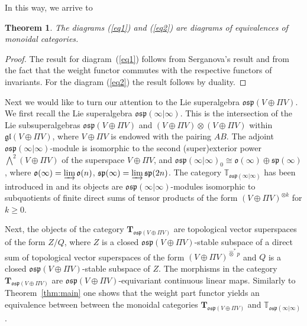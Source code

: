 \documentclass[12pt,reqno]{amsart}
\newtheorem{thm}{Theorem}[section]
\theoremstyle{definition}
\theoremstyle{remark}
\begin{document}
In this way, we arrive to
\begin{thm}\label{thm:main2}
    The diagrams (\ref{eq1}) and (\ref{eq2}) are diagrams of equivalences of monoidal categories.
\end{thm}
\begin{proof}
    The result for diagram~(\ref{eq1}) follows from Serganova's result and from the fact that the weight functor commutes with the respective functors of invariants. For the diagram (\ref{eq2}) the result follows by duality.
\end{proof}

Next we would like to turn our attention to the Lie superalgebra $\mathfrak{osp}(V \oplus \Pi V)$. We first recall the Lie superalgebra $\mathfrak{osp}(\infty | \infty)$. This is the intersection of the Lie subsuperalgebras 
$\mathfrak{osp}(V \oplus \Pi V)$ and $(V \oplus \Pi V)\otimes (V \oplus \Pi V)$ within $\mathfrak{gl}(V \oplus \Pi V)$,
where $V\oplus \Pi V$ is endowed with the pairing $AB$. The adjoint $\mathfrak{osp}(\infty | \infty)$-module is isomorphic to the second (super)exterior power $\bigwedge^2 (V \oplus \Pi V)$ of the superspace $V\oplus \Pi V$, and $\mathfrak{osp}(\infty | \infty)_0 \cong \mathfrak{o}(\infty)\oplus \mathfrak{sp}(\infty)$,
where $\mathfrak{o}(\infty) = \varinjlim \mathfrak{o}(n)$, $\mathfrak{sp}(\infty) = \varinjlim \mathfrak{sp}(2n)$.
The category $\mathbb{T}_{\mathfrak{osp}(\infty | \infty)}$ has been introduced in \cite{S} and its objects are 
$\mathfrak{osp}(\infty | \infty)$-modules isomorphic to subquotients of finite direct sums of tensor products of the form $(V \oplus \Pi V)^{\otimes k}$ for $k \geq 0$.

Next, the objects of the category $\mathbf{T}_{\mathfrak{osp}(V \oplus \Pi V)}$ are
topological vector superspaces of the form $Z/Q$, where $Z$ is a closed $\mathfrak{osp}(V \oplus \Pi V)$-stable subspace of a direct sum of topological vector superspaces of the form $(V\oplus \Pi V)^{\widehat{\otimes}^\ast p}$ and $Q$ is a closed $\mathfrak{osp}(V \oplus \Pi V)$-stable subspace of $Z$. The morphisms in the category $\mathbf{T}_{\mathfrak{osp}(V \oplus \Pi V)}$ are $\mathfrak{osp}(V \oplus \Pi V)$-equivariant continuous linear maps. Similarly to Theorem~\ref{thm:main} one shows that the weight part functor yields an equivalence between between the monoidal categories $\mathbf{T}_{\mathfrak{osp}(V \oplus \Pi V)}$ and $\mathbb{T}_{\mathfrak{osp}(\infty | \infty)}$.
\end{document}
